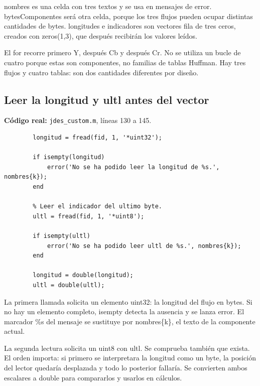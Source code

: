 \documentclass[11pt,a4paper,oneside]{report}
\begin{document}
nombres es una celda con tres textos y se usa en mensajes de error.
bytesComponentes será otra celda, porque los tres flujos pueden ocupar
distintas cantidades de bytes. longitudes e indicadores son vectores fila
de tres ceros, creados con zeros(1,3), que después recibirán los valores leídos.

El for recorre primero Y, después Cb y después Cr. No se utiliza un bucle
de cuatro porque estas son componentes, no familias de tablas Huffman.
Hay tres flujos y cuatro tablas: son dos cantidades diferentes por diseño.


\par\medskip\noindent\begin{minipage}{\linewidth}

\subsection{Leer la longitud y ultl antes del vector}

\textbf{Código real:} \texttt{jdes\_custom.m}, líneas 130 a 145.

\begin{lstlisting}[firstnumber=130]
        % Leer la cantidad de bytes de la componente.
        longitud = fread(fid, 1, '*uint32');

        if isempty(longitud)
            error('No se ha podido leer la longitud de %s.', nombres{k});
        end

        % Leer el indicador del ultimo byte.
        ultl = fread(fid, 1, '*uint8');

        if isempty(ultl)
            error('No se ha podido leer ultl de %s.', nombres{k});
        end

        longitud = double(longitud);
        ultl = double(ultl);
\end{lstlisting}

\end{minipage}\par


La primera llamada solicita un elemento uint32: la longitud del flujo en
bytes. Si no hay un elemento completo, isempty detecta la ausencia y se
lanza error. El marcador \%s del mensaje se sustituye por nombres\{k\},
el texto de la componente actual.

La segunda lectura solicita un uint8 con ultl. Se comprueba también que
exista. El orden importa: si primero se interpretara la longitud como un
byte, la posición del lector quedaría desplazada y todo lo posterior fallaría.
Se convierten ambos escalares a double para compararlos y usarlos en cálculos.
\end{document}
